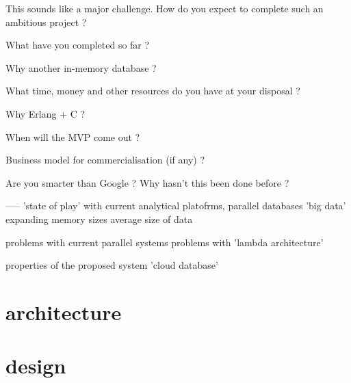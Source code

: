 \documentclass[12pt]{article}
\begin{document}
This sounds like a major challenge. How do you expect to complete such an ambitious project ?

What have you completed so far ?

Why another in-memory database ?

What time, money and other resources do you have at your disposal ?

Why Erlang + C ?

When will the MVP come out ?

Business model for commercialisation (if any) ?

Are you smarter than Google ? Why hasn’t this been done before ?




-----
'state of play' with current analytical platofrms, parallel databases
'big data'
expanding memory sizes
average size of data 

problems with current parallel systems
problems with 'lambda architecture'

properties of the proposed system
'cloud database'


\section{architecture}
\section{design}
\end{document}
